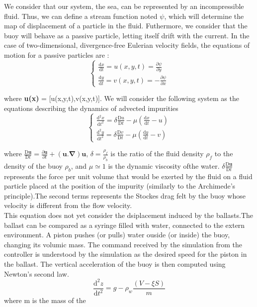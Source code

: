 \documentclass[a4paper]{report}
\begin{document}
We consider that our system, the sea, can be represented by an incompressible fluid. Thus, we can define a stream function noted $\psi$, which will determine the map of displacement of a particle in the fluid.
Futhermore, we consider that the buoy will behave as a passive particle, letting itself drift with the current.
In the case of two-dimensional, divergence-free Eulerian velocity fields, the equations of motion for a passive particles are : \begin{equation}
\left\{\begin{matrix}
\frac{\mathrm{d} x}{\mathrm{d} t}= u(x,y,t)=\frac{\partial \psi }{\partial y}\\ 
\frac{\mathrm{d} y}{\mathrm{d} t}= v(x,y,t)=-\frac{\partial \psi }{\partial x}
\end{matrix}\right.
\end{equation}

where \textbf{u(x)} = [u(x,y,t),v(x,y,t)].
We will consider the following system as the equations describing the dynamics of advected impurities
\begin{equation}
\left\{\begin{matrix}
\frac{\mathrm{d^2} x}{\mathrm{d} t^2}= \delta \frac{\mathrm{D} u}{\mathrm{D} t} -\mu (\frac{\mathrm{d} x }{\mathrm{d} t}-u)\\ 
\frac{\mathrm{d^2} y}{\mathrm{d} t^2}= \delta \frac{\mathrm{D} v}{\mathrm{D} t} -\mu (\frac{\mathrm{d} y}{\mathrm{d} t}-v)
\end{matrix}\right.
\end{equation}

where 
$
\frac{\mathrm{D} \mathbf{u}}{\mathrm{D} t} = \frac{\partial \mathbf{u} }{\partial t}+\mathbf{(u. \nabla )u}
$,
$\delta = \frac{\rho_f}{\rho_b}$
is the ratio of the fluid density $\rho_f$ to the density of the buoy $\rho_b$, and
$\mu \simeq 1$ is the dynamic viscosity ofthe water.
$\delta \frac{\mathrm{D} \mathbf{u}}{\mathrm{D} t}$ represents the force per unit volume that would be exerted by the fluid on a fluid particle placed at the position of the impurity (similarly to the Archimede's principle).The second terms represents the Stockes drag felt by the buoy whose velocity is different from the flow velocity.\\

This equation does not yet consider the dsiplacement induced by the ballasts.The ballast can be compared as a syringe filled with water, connected to the extern environment. A piston pushes (or pulls) water ouside (or inside) the buoy, changing its volumic mass.
The command received by the simulation from the controller is understood by the simulation as the desired speed for the piston in the ballast.
The vertical acceleration of the buoy is then computed using Newton's second law.\\
\begin{equation}
\frac{\mathrm{d^2} z}{\mathrm{d} t^2}= g-\rho_w \frac {\left ( V-\xi S \right )}{m}
\end{equation}
where m is the mass of the
\end{document}
